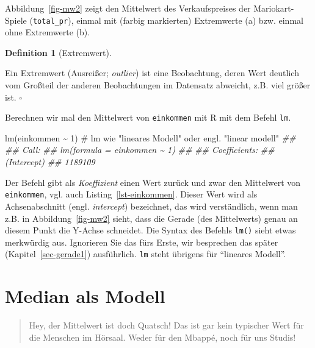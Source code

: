 \documentclass[
  letterpaper,
]{scrbook}
\newenvironment{Shaded}{\begin{snugshade}}{\end{snugshade}}
\newcommand{\CommentTok}[1]{\textcolor[rgb]{0.37,0.37,0.37}{#1}}
\newcommand{\DecValTok}[1]{\textcolor[rgb]{0.68,0.00,0.00}{#1}}
\newcommand{\DocumentationTok}[1]{\textcolor[rgb]{0.37,0.37,0.37}{\textit{#1}}}
\newcommand{\FunctionTok}[1]{\textcolor[rgb]{0.28,0.35,0.67}{#1}}
\newcommand{\NormalTok}[1]{\textcolor[rgb]{0.00,0.23,0.31}{#1}}
\newcommand{\SpecialCharTok}[1]{\textcolor[rgb]{0.37,0.37,0.37}{#1}}
\theoremstyle{definition}
\theoremstyle{definition}
\theoremstyle{definition}
\newtheorem{definition}{Definition}[chapter]
\theoremstyle{remark}
\begin{document}
Abbildung~\ref{fig-mw2} zeigt den Mittelwert des Verkaufspreises der
Mariokart-Spiele (\texttt{total\_pr}), einmal mit (farbig markierten)
Extremwerte (a) bzw. einmal ohne Extremwerte (b).

\begin{definition}[Extremwert]\protect\hypertarget{def-extremwert}{}\label{def-extremwert}

Ein Extremwert (Ausreißer; \emph{outlier}) ist eine Beobachtung, deren
Wert deutlich vom Großteil der anderen Beobachtungen im Datensatz
abweicht, z.B. viel größer ist. \(\square\)

\end{definition}

Berechnen wir mal den Mittelwert von \texttt{einkommen} mit R mit dem
Befehl \texttt{lm}.

\begin{Shaded}
\begin{Highlighting}[]
\FunctionTok{lm}\NormalTok{(einkommen }\SpecialCharTok{\textasciitilde{}} \DecValTok{1}\NormalTok{)  }\CommentTok{\# lm wie "lineares Modell" oder engl. "linear modell"}
\DocumentationTok{\#\# }
\DocumentationTok{\#\# Call:}
\DocumentationTok{\#\# lm(formula = einkommen \textasciitilde{} 1)}
\DocumentationTok{\#\# }
\DocumentationTok{\#\# Coefficients:}
\DocumentationTok{\#\# (Intercept)  }
\DocumentationTok{\#\#     1189109}
\end{Highlighting}
\end{Shaded}

Der Befehl gibt als \emph{Koeffizient} einen Wert zurück und zwar den
Mittelwert von \texttt{einkommen}, vgl. auch
Listing~\ref{lst-einkommen}. Dieser Wert wird als Achsenabschnitt (engl.
\emph{intercept}) bezeichnet, das wird verständlich, wenn man z.B. in
Abbildung~\ref{fig-mw2} sieht, dass die Gerade (des Mittelwerts) genau
an diesem Punkt die Y-Achse schneidet. Die Syntax des Befehls
\texttt{lm()} sieht etwas merkwürdig aus. Ignorieren Sie das fürs Erste,
wir besprechen das später (Kapitel~\ref{sec-gerade1}) ausführlich.
\texttt{lm} steht übrigens für \enquote{lineares Modell}.

\section{Median als Modell}\label{sec-median}

\begin{quote}
{} Hey, der Mittelwert ist doch Quatsch! Das ist gar kein
typischer Wert für die Menschen im Hörsaal. Weder für den Mbappé, noch
für uns Studis!
\end{quote}
\end{document}
